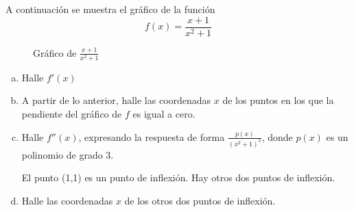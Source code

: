 \documentclass[spanish,12pt]{article}
\begin{document}
A continuación se muestra el gráfico de la función 
$$f(x)=\frac{x+1}{x^2+1}$$

\begin{figure}[h!]
		\begin{center}
	        \caption{Gráfico de $\frac{x+1}{x^2+1}$}
	    \end{center}
	\end{figure}
   \begin{enumerate}[(a)]
       \item Halle $f'(x)$
       \item A partir de lo anterior, halle las coordenadas $x$ de los puntos en los que la pendiente del
gráfico de $f$ es igual a cero.
        \item Halle $f''(x)$, expresando la respuesta de forma $\frac{p(x)}{(x^2+1)^3}$, donde $p(x)$ es un polinomio de grado 3.

El punto (1,1) es un punto de inflexión. Hay otros dos puntos de inflexión.
        \item Halle las coordenadas $x$ de los otros dos puntos de inflexión.

   \end{enumerate} 
\end{document}
